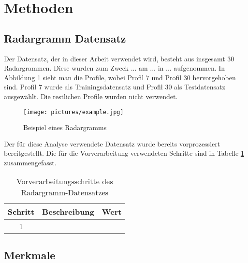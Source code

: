 \section{Methoden}

\subsection{Radargramm Datensatz}
Der Datensatz, der in dieser Arbeit verwendet wird, besteht aus insgesamt 30 Radargrammen. Diese wurden zum Zweck ... am ... in ... aufgenommen. In Abbildung \ref{fig:example} sieht man die Profile, wobei Profil 7 und Profil 30 hervorgehoben sind. Profil 7 wurde als Trainingsdatensatz und Profil 30 als Testdatensatz ausgewählt. Die restlichen Profile wurden nicht verwendet.\\

\begin{center}
    \begin{figure}[h!]
        \centering
        \texttt{[image: pictures/example.jpg]}
        \caption{Beispiel eines Radargramms}
        \label{fig:example}
    \end{figure}
\end{center}

Der für diese Analyse verwendete Datensatz wurde bereits vorprozessiert bereitgestellt. Die für die Vorverarbeitung verwendeten Schritte sind in Tabelle \ref{tab:preprocessing} zusammengefasst. \\

\begin{table}[h!]
    \centering
    \caption{Vorverarbeitungsschritte des Radargramm-Datensatzes}
    \label{tab:preprocessing}
    \begin{tabular}{|c|c|c|}
        \hline
        \textbf{Schritt} & \textbf{Beschreibung} & \textbf{Wert} \\
        \hline
        1 & & \\
        \hline
        
    \end{tabular}
\end{table}

\clearpage

\subsection{Merkmale}

